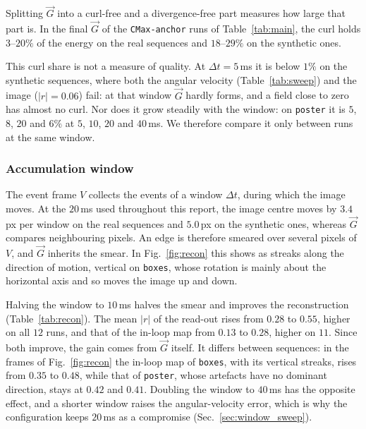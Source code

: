 \documentclass[journal]{IEEEtran}
\newcommand{\Vmap}{V}
\newcommand{\Gmap}{\vec{G}}
\begin{document}
Splitting $\Gmap$ into a curl-free and a divergence-free part measures how large that part is. In the final $\Gmap$ of the \texttt{CMax-anchor} runs of Table~\ref{tab:main}, the curl holds $3$--$20\%$ of the energy on the real sequences and $18$--$29\%$ on the synthetic ones.

This curl share is not a measure of quality. At $\Delta t = 5$\,ms it is below $1\%$ on the synthetic sequences,  where both the angular velocity (Table~\ref{tab:sweep}) and the image ($|r| = 0.06$) fail: at that window $\Gmap$ hardly forms, and a field close to zero has almost no curl. Nor does it grow steadily with the window: on \texttt{poster} it is $5$, $8$, $20$ and $6\%$ at $5$, $10$, $20$ and $40$\,ms. We therefore compare it only between runs at the same window.

\subsubsection{Accumulation window}

The event frame $\Vmap$ collects the events of a window $\Delta t$, during which the image moves. At the $20$\,ms used throughout this report, the image centre moves by $3.4$\,px per window on the real sequences and $5.0$\,px on the synthetic ones, whereas $\Gmap$ compares neighbouring pixels. An edge is therefore smeared over several pixels of $\Vmap$, and $\Gmap$ inherits the smear. In Fig.~\ref{fig:recon} this shows as streaks along the direction of motion, vertical on \texttt{boxes}, whose rotation is mainly about the horizontal axis and so moves the image up and down.

Halving the window to $10$\,ms halves the smear and improves the reconstruction (Table~\ref{tab:recon}). The mean $|r|$ of the read-out rises from $0.28$ to $0.55$, higher on all $12$ runs, and that of the in-loop map from $0.13$ to $0.28$, higher on $11$. Since both improve, the gain comes from $\Gmap$ itself. It differs between sequences: in the frames of Fig.~\ref{fig:recon} the in-loop map of \texttt{boxes}, with its vertical streaks, rises from $0.35$ to $0.48$, while that of \texttt{poster}, whose artefacts have no dominant direction, stays at $0.42$ and $0.41$. Doubling the window to $40$\,ms has the opposite effect, and a shorter window raises the angular-velocity error, which is why the configuration keeps $20$\,ms as a compromise (Sec.~\ref{sec:window_sweep}).
\end{document}

